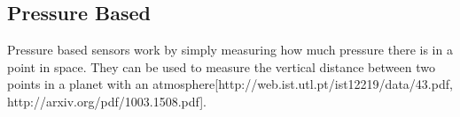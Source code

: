 \subsection{Pressure Based}
Pressure based sensors work by simply measuring how much pressure there is in a point in space. They can be used to measure the vertical distance between two points in a planet with an atmosphere[http://web.ist.utl.pt/ist12219/data/43.pdf, http://arxiv.org/pdf/1003.1508.pdf].
